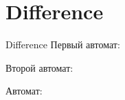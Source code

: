 \section{Difference}
\begin{frame}{Difference}
	Первый автомат:


	Второй автомат:


	Автомат:

\end{frame}
